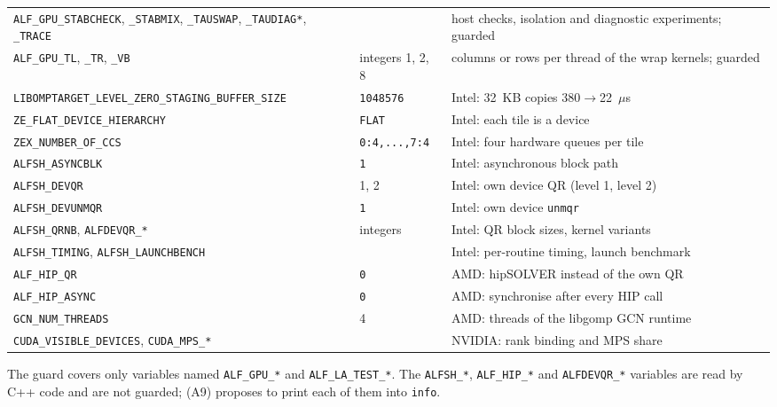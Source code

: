 \begin{footnotesize}
\begin{longtable}{@{}>{\raggedright}p{4.3cm}>{\raggedright}p{2.6cm}>{\raggedright\arraybackslash}p{8.0cm}@{}}
\texttt{ALF\_GPU\_STABCHECK}, \texttt{\_STABMIX}, \texttt{\_TAUSWAP}, \texttt{\_TAUDIAG*}, \texttt{\_TRACE} & & host checks, isolation and diagnostic experiments; guarded \\
\texttt{ALF\_GPU\_TL}, \texttt{\_TR}, \texttt{\_VB} & integers 1, 2, 8 & columns or rows per thread of the wrap kernels; guarded \\
\texttt{LIBOMPTARGET\_LEVEL\_ZERO\_STAGING\_BUFFER\_SIZE} & \texttt{1048576} & Intel: 32~KB copies 380$\to$22~$\mu$s \\
\texttt{ZE\_FLAT\_DEVICE\_HIERARCHY} & \texttt{FLAT} & Intel: each tile is a device \\
\texttt{ZEX\_NUMBER\_OF\_CCS} & \texttt{0:4,...,7:4} & Intel: four hardware queues per tile \\
\texttt{ALFSH\_ASYNCBLK} & \texttt{1} & Intel: asynchronous block path \\
\texttt{ALFSH\_DEVQR} & 1, 2 & Intel: own device QR (level 1, level 2) \\
\texttt{ALFSH\_DEVUNMQR} & \texttt{1} & Intel: own device \texttt{unmqr} \\
\texttt{ALFSH\_QRNB}, \texttt{ALFDEVQR\_*} & integers & Intel: QR block sizes, kernel variants \\
\texttt{ALFSH\_TIMING}, \texttt{ALFSH\_LAUNCHBENCH} & & Intel: per-routine timing, launch benchmark \\
\texttt{ALF\_HIP\_QR} & \texttt{0} & AMD: hipSOLVER instead of the own QR \\
\texttt{ALF\_HIP\_ASYNC} & \texttt{0} & AMD: synchronise after every HIP call \\
\texttt{GCN\_NUM\_THREADS} & 4 & AMD: threads of the libgomp GCN runtime \\
\texttt{CUDA\_VISIBLE\_DEVICES}, \texttt{CUDA\_MPS\_*} & & NVIDIA: rank binding and MPS share \\
\bottomrule
\end{longtable}
\end{footnotesize}

The guard covers only variables named \texttt{ALF\_GPU\_*} and \texttt{ALF\_LA\_TEST\_*}. The \texttt{ALFSH\_*}, \texttt{ALF\_HIP\_*} and \texttt{ALFDEVQR\_*} variables are read by C++ code and are not guarded;  (A9) proposes to print each of them into \texttt{info}.

